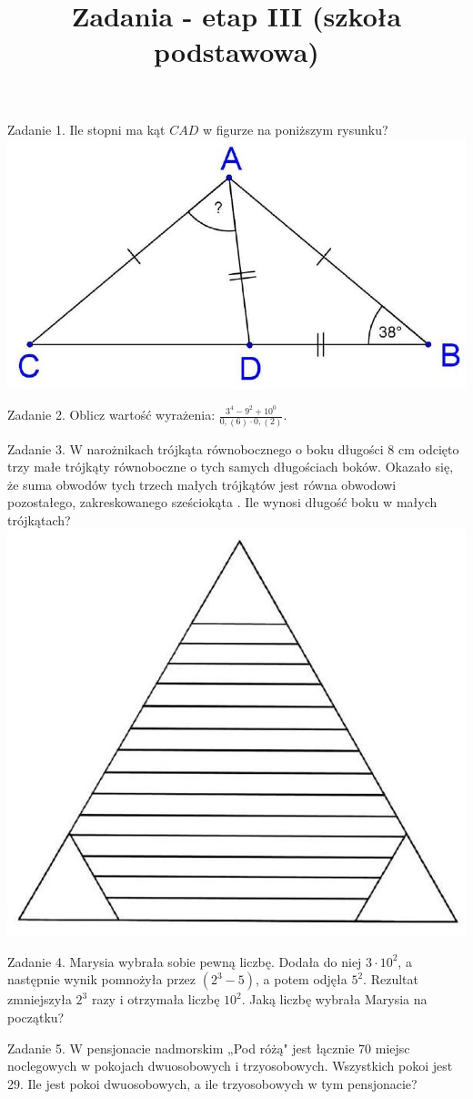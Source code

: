 \documentclass[10pt]{article}
\title{Zadania - etap III (szkoła podstawowa) }
\author{}
\date{}
\begin{document}
\maketitle
Zadanie 1. Ile stopni ma kąt \(C A D\) w figurze na poniższym rysunku?\\
\includegraphics[max width=\textwidth, center]{2024_11_21_4c6a68efbf7bb0941ed2g-1(1)}

Zadanie 2. Oblicz wartość wyrażenia: \(\frac{3^{4}-9^{2}+10^{0}}{0,(6) \cdot 0,(2)}\).

Zadanie 3. W narożnikach trójkąta równobocznego o boku długości 8 cm odcięto trzy małe trójkąty równoboczne o tych samych długościach boków. Okazało się, że suma obwodów tych trzech małych trójkątów jest równa obwodowi pozostałego, zakreskowanego sześciokąta . Ile wynosi długość boku w małych trójkątach?\\
\includegraphics[max width=\textwidth, center]{2024_11_21_4c6a68efbf7bb0941ed2g-1}

Zadanie 4. Marysia wybrała sobie pewną liczbę. Dodała do niej \(3 \cdot 10^{2}\), a następnie wynik pomnożyła przez \(\left(2^{3}-5\right)\), a potem odjęła \(5^{2}\). Rezultat zmniejszyła \(2^{3}\) razy i otrzymała liczbę \(10^{2}\). Jaką liczbę wybrała Marysia na początku?

Zadanie 5. W pensjonacie nadmorskim „Pod różą" jest łącznie 70 miejsc noclegowych w pokojach dwuosobowych i trzyosobowych. Wszystkich pokoi jest 29. Ile jest pokoi dwuosobowych, a ile trzyosobowych w tym pensjonacie?
\end{document}
